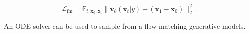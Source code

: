 \begin{equation}
    \mathcal{L}_{\mathrm{fm}} = \mathbb{E}_{t, \boldsymbol{x}_0, \boldsymbol{x}_1} \|\boldsymbol{v}_\theta(\boldsymbol{x}_t \vert y) - (\boldsymbol{x}_1 - \boldsymbol{x}_0)\|_2^2.
\end{equation}

 An ODE solver can be used to sample from a flow matching generative models.

